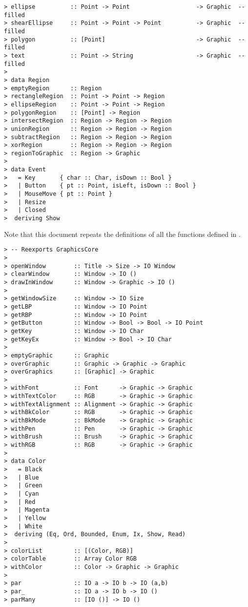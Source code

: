 \begin{verbatim}
> ellipse          :: Point -> Point                   -> Graphic  -- filled
> shearEllipse     :: Point -> Point -> Point          -> Graphic  -- filled
> polygon          :: [Point]                          -> Graphic  -- filled
> text             :: Point -> String                  -> Graphic  -- filled
> 
> data Region
> emptyRegion      :: Region
> rectangleRegion  :: Point -> Point -> Region
> ellipseRegion    :: Point -> Point -> Region
> polygonRegion    :: [Point] -> Region
> intersectRegion  :: Region -> Region -> Region
> unionRegion      :: Region -> Region -> Region
> subtractRegion   :: Region -> Region -> Region
> xorRegion        :: Region -> Region -> Region
> regionToGraphic  :: Region -> Graphic
> 
> data Event 
>   = Key       { char :: Char, isDown :: Bool }
>   | Button    { pt :: Point, isLeft, isDown :: Bool }
>   | MouseMove { pt :: Point }
>   | Resize
>   | Closed
>  deriving Show 
\end{verbatim}



Note that this document repeats the definitions of all the functions
defined in .


\begin{verbatim}
> -- Reexports GraphicsCore
>
> openWindow        :: Title -> Size -> IO Window
> clearWindow       :: Window -> IO ()
> drawInWindow      :: Window -> Graphic -> IO ()
> 
> getWindowSize     :: Window -> IO Size
> getLBP            :: Window -> IO Point
> getRBP            :: Window -> IO Point
> getButton         :: Window -> Bool -> Bool -> IO Point
> getKey            :: Window -> IO Char
> getKeyEx          :: Window -> Bool -> IO Char
> 
> emptyGraphic      :: Graphic
> overGraphic       :: Graphic -> Graphic -> Graphic
> overGraphics      :: [Graphic] -> Graphic
> 
> withFont          :: Font      -> Graphic -> Graphic
> withTextColor     :: RGB       -> Graphic -> Graphic
> withTextAlignment :: Alignment -> Graphic -> Graphic
> withBkColor       :: RGB       -> Graphic -> Graphic
> withBkMode        :: BkMode    -> Graphic -> Graphic
> withPen           :: Pen       -> Graphic -> Graphic
> withBrush         :: Brush     -> Graphic -> Graphic
> withRGB           :: RGB       -> Graphic -> Graphic
> 
> data Color 
>   = Black
>   | Blue
>   | Green 
>   | Cyan
>   | Red 
>   | Magenta
>   | Yellow
>   | White
>  deriving (Eq, Ord, Bounded, Enum, Ix, Show, Read)
> 
> colorList         :: [(Color, RGB)]
> colorTable        :: Array Color RGB
> withColor         :: Color -> Graphic -> Graphic
> 
> par               :: IO a -> IO b -> IO (a,b)
> par_              :: IO a -> IO b -> IO ()
> parMany           :: [IO ()] -> IO ()
\end{verbatim}

